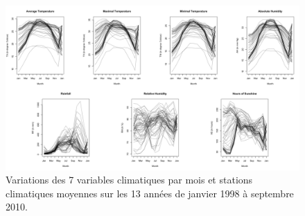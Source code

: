 \begin{figure}[h]
\includegraphics[width = \linewidth]{../figures/chap2/Pic2_3.png}
\caption{Variations des 7 variables climatiques par mois et stations climatiques moyennes sur les 13 années de janvier 1998 à septembre 2010.}
\label{Pic2_3}	
\end{figure}



